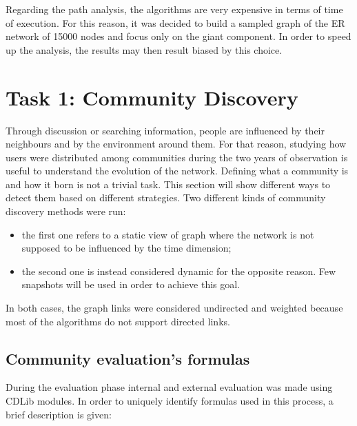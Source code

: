 \documentclass[sigchi]{acmart}
\begin{document}
Regarding the path analysis, the algorithms are very expensive in terms of time of execution. For this reason, it was decided to build a sampled graph of the ER network of 15000 nodes and focus only on the giant component. In order to speed up the analysis, the results may then result biased by this choice.

\section{Task 1: Community Discovery}

Through discussion or searching information, people are influenced by their neighbours and by the environment around them. For that reason, studying how users were distributed among communities during the two years of observation is useful to understand the evolution of the network. 
Defining what a community is and how it born is not a trivial task. This section will show different ways to detect them based on different strategies.
Two different kinds of community discovery methods were run:

\begin{itemize}
    \item the first one refers to a static view of graph where the network is not supposed to be influenced by the time dimension;
    \item the second one is instead considered dynamic for the opposite reason. Few snapshots will be used in order to achieve this goal.
\end{itemize}

In both cases, the graph links were considered undirected and weighted because most of the algorithms do not support directed links.

\subsection{Community evaluation’s formulas}
During the evaluation phase internal and external evaluation was made using CDLib modules. In order to uniquely identify formulas used in this process, a brief description is given:
\end{document}
